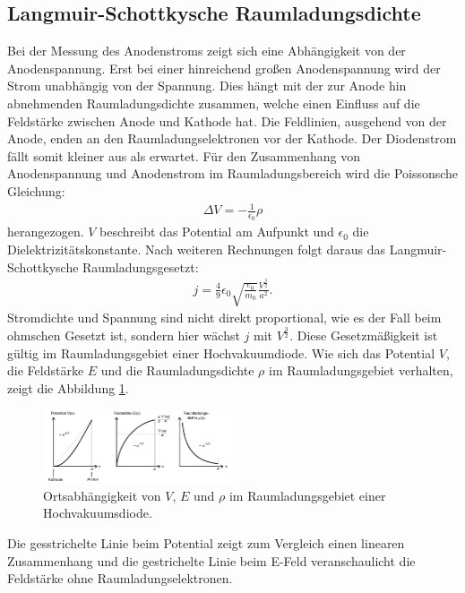 \subsection{Langmuir-Schottkysche Raumladungsdichte}
Bei der Messung des Anodenstroms zeigt sich eine Abhängigkeit von der Anodenspannung.
Erst bei einer hinreichend großen Anodenspannung wird der Strom unabhängig von der Spannung.
Dies hängt mit der zur Anode hin abnehmenden Raumladungsdichte zusammen, welche einen Einfluss
auf die Feldstärke zwischen Anode und Kathode hat. Die Feldlinien, ausgehend von der Anode, enden
an den Raumladungselektronen vor der Kathode. Der Diodenstrom fällt somit kleiner aus als erwartet.
Für den Zusammenhang von Anodenspannung und Anodenstrom im Raumladungsbereich wird die
Poissonsche Gleichung:
\begin{align}
\Delta V =-\frac{1}{\epsilon_\mathrm{0}}\rho
\end{align}
herangezogen. $V$ beschreibt das Potential am Aufpunkt und $\epsilon_\mathrm{0}$ die Dielektrizitätskonstante.
Nach weiteren Rechnungen folgt daraus das Langmuir-Schottkysche Raumladungsgesetzt:
\begin{align}
j=\frac{4}{9}\epsilon_\mathrm{0}\sqrt{\frac{e_\mathrm{0}}{m_\mathrm{0}}}\frac{V^{\frac{3}{2}}}{a^2} .\label{eqn:LRS}
\end{align}
Stromdichte und Spannung sind nicht direkt proportional, wie es der Fall beim ohmschen Gesetzt ist, sondern
hier wächst $j$ mit $V^{\frac{3}{2}}$. Diese Gesetzmäßigkeit ist gültig im Raumladungsgebiet einer Hochvakuumdiode.
Wie sich das Potential $V$, die Feldstärke $E$ und die Raumladungsdichte $\rho$ im Raumladungsgebiet
verhalten, zeigt die Abbildung \ref{fig:verlauf}.
\begin{figure}
 \centering
 \includegraphics[width=0.5\textwidth]{verlauf.png}
 \caption{Ortsabhängigkeit von $V$, $E$ und $\rho$ im Raumladungsgebiet einer Hochvakuumsdiode.\cite{sample}}
 \label{fig:verlauf}
 \end{figure}
Die gesstrichelte Linie beim Potential zeigt zum Vergleich einen linearen Zusammenhang
und die gestrichelte Linie beim E-Feld veranschaulicht die Feldstärke ohne Raumladungselektronen.

